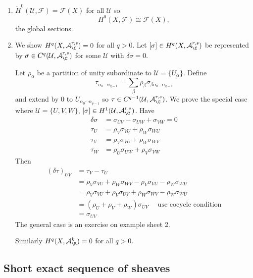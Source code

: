 \documentclass[a4paper]{article}
\begin{document}
\begin{eg}\leavevmode
  \begin{enumerate}
  \item \(\check H^0(\mathcal U, \mathcal F) = \mathcal F(X)\) for all \(\mathcal U\) so
    \[
      H^0(X, \mathcal F) \cong \mathcal F(X),
    \]
    the global sections.
  \item We show \(H^q(X, \mathcal A_\C^{r, s}) = 0\) for all \(q > 0\). Let \([\sigma] \in H^q(X, \mathcal A_\C^{r, s})\) be represented by \(\sigma \in C^q(\mathcal U, \mathcal A_\C^{r, s})\) for some \(\mathcal U\) with \(\delta \sigma = 0\).

    Let \(\rho_\alpha\) be a partition of unity subordinate to \(\mathcal U = \{U_\alpha\}\). Define
    \[
      \tau_{\alpha_0 \cdots \alpha_{q - 1}} = \sum_\beta \rho_\beta \sigma_{\beta \alpha_0 \cdots \alpha_{q - 1}}
    \]
    and extend by \(0\) to \(U_{\alpha_0 \cdots \alpha_{q - 1}}\) so \(\tau \in C^{q - 1}(\mathcal U, \mathcal A_\C^{r, s})\). We prove the special case where \(\mathcal U = \{U, V, W\}\), \([\sigma] \in H^1(\mathcal U, \mathcal A_\C^{r, s})\). Have
    \begin{align*}
      \delta \sigma &= \sigma_{UV} - \sigma_{UW} + \sigma_{VW} = 0 \\
      \tau_U &= \rho_V \sigma_{VU} + \rho_W \sigma_{WU} \\
      \tau_V &= \rho_V \sigma_{VU} + \rho_W \sigma_{WV} \\
      \tau_W &= \rho_U \sigma_{UW} + \rho_V \sigma_{VW}
    \end{align*}
    Then
    \begin{align*}
      (\delta \tau)_{UV}
      &= \tau_V - \tau_U \\
      &= \rho_V \sigma_{VU} + \rho_W \sigma_{WV} - \rho_V \sigma_{VU} - \rho_W \sigma_{WU} \\
      &= \rho_V \sigma_{VU} + \rho_V \sigma_{UV} + \rho_W \sigma_{WV} - \rho_W \sigma_{WU} \\
      &= (\rho_U + \rho_V + \rho_W) \sigma_{UV} \quad \text{ use cocycle condition} \\
      &= \sigma_{UV}
    \end{align*}
    The general case is an exercise on example sheet 2.

    Similarly \(H^q(X, \mathcal A_\R^k) = 0\) for all \(q > 0\).
  \end{enumerate}
\end{eg}

\subsection{Short exact sequence of sheaves}
\end{document}
